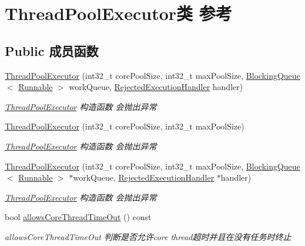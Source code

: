 \hypertarget{classThreadPoolExecutor}{}\section{Thread\+Pool\+Executor类 参考}
\label{classThreadPoolExecutor}
\subsection*{Public 成员函数}
\begin{DoxyCompactItemize}
\item 
\hyperlink{classThreadPoolExecutor_adc2bbcf28a95be1ba7fea937f6ba7998}{Thread\+Pool\+Executor} (int32\+\_\+t core\+Pool\+Size, int32\+\_\+t max\+Pool\+Size, \hyperlink{classBlockingQueue}{Blocking\+Queue}$<$ \hyperlink{classRunnable}{Runnable} $>$ work\+Queue, \hyperlink{classRejectedExecutionHandler}{Rejected\+Execution\+Handler} handler)
\begin{DoxyCompactList}\small\item\em \hyperlink{classThreadPoolExecutor}{Thread\+Pool\+Executor} 构造函数 会抛出异常 \end{DoxyCompactList}\item 
\hyperlink{classThreadPoolExecutor_a226b8d6d38ce601e27974eb2e8b1dbb9}{Thread\+Pool\+Executor} (int32\+\_\+t core\+Pool\+Size, int32\+\_\+t max\+Pool\+Size)
\begin{DoxyCompactList}\small\item\em \hyperlink{classThreadPoolExecutor}{Thread\+Pool\+Executor} 构造函数 会抛出异常 \end{DoxyCompactList}\item 
\hyperlink{classThreadPoolExecutor_ace4ccc92f13fdeed49fb5e6efb7ee233}{Thread\+Pool\+Executor} (int32\+\_\+t core\+Pool\+Size, int32\+\_\+t max\+Pool\+Size, \hyperlink{classBlockingQueue}{Blocking\+Queue}$<$ \hyperlink{classRunnable}{Runnable} $>$ $\ast$work\+Queue, \hyperlink{classRejectedExecutionHandler}{Rejected\+Execution\+Handler} $\ast$handler)
\begin{DoxyCompactList}\small\item\em \hyperlink{classThreadPoolExecutor}{Thread\+Pool\+Executor} 构造函数 会抛出异常 \end{DoxyCompactList}\item 
bool \hyperlink{classThreadPoolExecutor_acb920195bb39c64c97ed0644693a3592}{allows\+Core\+Thread\+Time\+Out} () const
\begin{DoxyCompactList}\small\item\em allows\+Core\+Thread\+Time\+Out 判断是否允许core thread超时并且在没有任务时终止 \end{DoxyCompactList}\item 

\end{DoxyCompactItemize}
